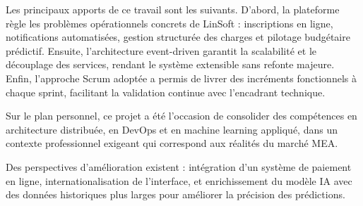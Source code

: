 \documentclass[12pt,a4paper]{report}
\begin{document}
Les principaux apports de ce travail sont les suivants. D'abord, la plateforme
r\`egle les probl\`emes op\'erationnels concrets de LinSoft : inscriptions en ligne,
notifications automatis\'ees, gestion structur\'ee des charges et pilotage budg\'etaire
pr\'edictif. Ensuite, l'architecture event-driven garantit la scalabilit\'e et le
d\'ecouplage des services, rendant le syst\`eme extensible sans refonte majeure.
Enfin, l'approche Scrum adopt\'ee a permis de livrer des incr\'ements fonctionnels
\`a chaque sprint, facilitant la validation continue avec l'encadrant technique.

Sur le plan personnel, ce projet a \'et\'e l'occasion de consolider des comp\'etences
en architecture distribu\'ee, en DevOps et en machine learning appliqu\'e, dans un
contexte professionnel exigeant qui correspond aux r\'ealit\'es du march\'e MEA.

Des perspectives d'am\'elioration existent : int\'egration d'un syst\`eme de paiement
en ligne, internationalisation de l'interface, et enrichissement du mod\`ele IA avec
des donn\'ees historiques plus larges pour am\'eliorer la pr\'ecision des pr\'edictions.
\end{document}
